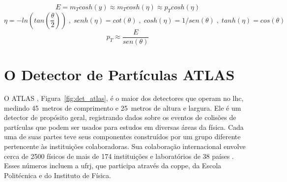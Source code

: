 \begin{equation}\label{eq:etot}
E = m_{T}cosh(y) \approx m_{T}cosh(\eta) \approx p_{T}cosh(\eta)
\end{equation}
\begin{equation}\label{eq:eta}
\eta = -ln \left( tan\left( \frac{\theta}{2} \right) \right) \;,\; senh(\eta) =
cot(\theta) \;,\;  cosh(\eta) = 1 / sen(\theta) \;,\; tanh(\eta) = cos(\theta) 
\end{equation}
\begin{equation}\label{eq:e_pt}
p_T \approx \frac{E}{sen(\theta)}
\end{equation}



\section{O Detector de Partículas ATLAS}

O ATLAS \cite{ATLAS_TDR,ATLAS_TDR2,paper_atlas}, Figura~\ref{fig:det_atlas}, é o maior 
dos detectores que operam no \gls{lhc}, medindo 45~metros de comprimento e 25~metros de altura 
e largura. Ele é um detector de propósito geral, registrando dados sobre os eventos de colisões de 
partículas que podem ser usados para estudos em diversas áreas da física. Cada uma de suas partes 
teve seus componentes construídos por um grupo diferente pertencente às instituições colaboradoras. 
Sua colaboração internacional envolve cerca de 2500 físicos de mais de 174 instituições 
e laboratórios de 38 países \cite{webATLAS}. Esses números incluem a \acrshort{ufrj}, que participa 
através da \acrshort{coppe}, da Escola Politécnica e do Instituto de Física. 

